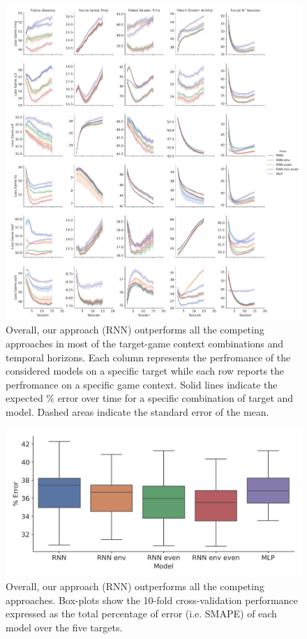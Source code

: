\begin{figure}[H]
\centering
\includegraphics[height=0.5\textheight,keepaspectratio]{images/chapter_3/models_comparison_non_collapsed_33.png}
\caption[\textbf{Model comparison without collapsing}]{ Overall, our approach (RNN) outperforms all the competing approaches in most of the target-game context combinations and temporal horizons. Each column represents the perfromance of the considered models on a specific target while each row reports the perfromance on a specific game context. Solid lines indicate the expected \% error over time for a specific combination of target and model. Dashed areas indicate the standard error of the mean.}
\label{model_comp_non_coll_33} 
\end{figure}
\lorem
\begin{figure}[h]
\centering
\includegraphics[width=.5\columnwidth]{images/chapter_3/performance_collapsed_33.png}
\caption[\textbf{Aggregated comparison of model performance}]{ Overall, our approach (RNN) outperforms all the competing approaches. Box-plots show the 10-fold cross-validation performance expressed as the total percentage of error (i.e. SMAPE) of each model over the five targets.}
\label{model_comp_coll_33} 
\end{figure}
